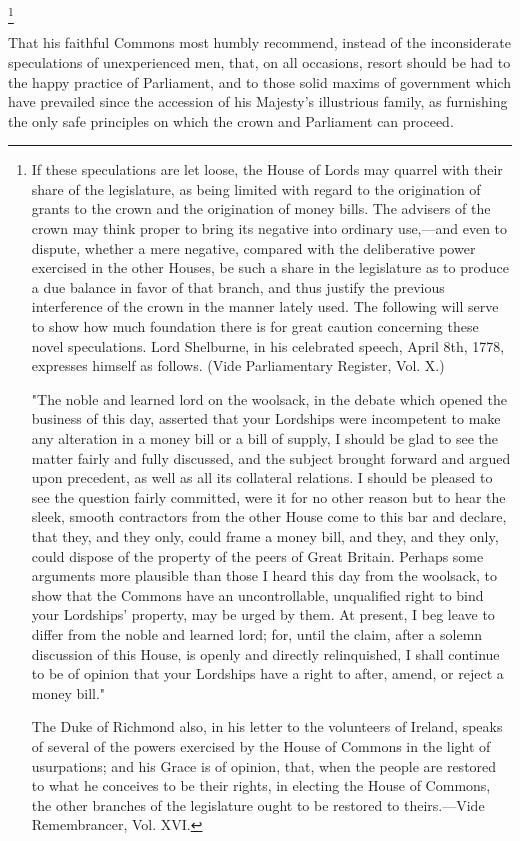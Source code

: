 \footnote{ If these speculations are let loose, the House of Lords may quarrel with their share of the legislature, as being limited with regard to the origination of grants to the crown and the origination of money bills. The advisers of the crown may think proper to bring its negative into ordinary use,—and even to dispute, whether a mere negative, compared with the deliberative power exercised in the other Houses, be such a share in the legislature as to produce a due balance in favor of that branch, and thus justify the previous interference of the crown in the manner lately used. The following will serve to show how much foundation there is for great caution concerning these novel speculations. Lord Shelburne, in his celebrated speech, April 8th, 1778, expresses himself as follows. (Vide Parliamentary Register, Vol. X.)

"The noble and learned lord on the woolsack, in the debate which opened the business of this day, asserted that your Lordships were incompetent to make any alteration in a money bill or a bill of supply, I should be glad to see the matter fairly and fully discussed, and the subject brought forward and argued upon precedent, as well as all its collateral relations. I should be pleased to see the question fairly committed, were it for no other reason but to hear the sleek, smooth contractors from the other House come to this bar and declare, that they, and they only, could frame a money bill, and they, and they only, could dispose of the property of the peers of Great Britain. Perhaps some arguments more plausible than those I heard this day from the woolsack, to show that the Commons have an uncontrollable, unqualified right to bind your Lordships' property, may be urged by them. At present, I beg leave to differ from the noble and learned lord; for, until the claim, after a solemn discussion of this House, is openly and directly relinquished, I shall continue to be of opinion that your Lordships have a right to after, amend, or reject a money bill."

The Duke of Richmond also, in his letter to the volunteers of Ireland, speaks of several of the powers exercised by the House of Commons in the light of usurpations; and his Grace is of opinion, that, when the people are restored to what he conceives to be their rights, in electing the House of Commons, the other branches of the legislature ought to be restored to theirs.—Vide Remembrancer, Vol. XVI.
}

That his faithful Commons most humbly recommend, instead of the inconsiderate speculations of unexperienced men, that, on all occasions, resort should be had to the happy practice of Parliament, and to those solid maxims of government which have prevailed since the accession of his Majesty's illustrious family, as furnishing the only safe principles on which the crown and Parliament can proceed.

